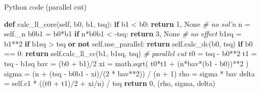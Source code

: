 \documentclass[
  ignorenonframetext,
  aspectratio=169,
  serif,onlymath]{beamer}
\newenvironment{Shaded}{}{}
\newcommand{\CommentTok}[1]{\textcolor[rgb]{0.38,0.63,0.69}{\textit{#1}}}
\newcommand{\ControlFlowTok}[1]{\textcolor[rgb]{0.00,0.44,0.13}{\textbf{#1}}}
\newcommand{\DecValTok}[1]{\textcolor[rgb]{0.25,0.63,0.44}{#1}}
\newcommand{\KeywordTok}[1]{\textcolor[rgb]{0.00,0.44,0.13}{\textbf{#1}}}
\newcommand{\NormalTok}[1]{#1}
\newcommand{\OperatorTok}[1]{\textcolor[rgb]{0.40,0.40,0.40}{#1}}
\newcommand{\VariableTok}[1]{\textcolor[rgb]{0.10,0.09,0.49}{#1}}
\begin{document}
\begin{frame}[fragile]{Python code (parallel cut)}
\protect\hypertarget{python-code-parallel-cut}{}

\scriptsize

\begin{Shaded}
\begin{Highlighting}[]
\KeywordTok{def}\NormalTok{ calc_ll_core(}\VariableTok{self}\NormalTok{, b0, b1, tsq):}
    \ControlFlowTok{if}\NormalTok{ b1 }\OperatorTok{<}\NormalTok{ b0:}
        \ControlFlowTok{return} \DecValTok{1}\NormalTok{, }\VariableTok{None}  \CommentTok{# no sol'n}
\NormalTok{    n }\OperatorTok{=} \VariableTok{self}\NormalTok{._n}
\NormalTok{    b0b1 }\OperatorTok{=}\NormalTok{ b0}\OperatorTok{*}\NormalTok{b1}
    \ControlFlowTok{if}\NormalTok{ n}\OperatorTok{*}\NormalTok{b0b1 }\OperatorTok{<} \OperatorTok{-}\NormalTok{tsq:}
        \ControlFlowTok{return} \DecValTok{3}\NormalTok{, }\VariableTok{None}  \CommentTok{# no effect}
\NormalTok{    b1sq }\OperatorTok{=}\NormalTok{ b1}\OperatorTok{**}\DecValTok{2}
    \ControlFlowTok{if}\NormalTok{ b1sq }\OperatorTok{>}\NormalTok{ tsq }\KeywordTok{or} \KeywordTok{not} \VariableTok{self}\NormalTok{.use_parallel:}
        \ControlFlowTok{return} \VariableTok{self}\NormalTok{.calc_dc(b0, tsq)}
    \ControlFlowTok{if}\NormalTok{ b0 }\OperatorTok{==} \DecValTok{0}\NormalTok{:}
        \ControlFlowTok{return} \VariableTok{self}\NormalTok{.calc_ll_cc(b1, b1sq, tsq)}
    \CommentTok{# parallel cut}
\NormalTok{    t0 }\OperatorTok{=}\NormalTok{ tsq }\OperatorTok{-}\NormalTok{ b0}\OperatorTok{**}\DecValTok{2}
\NormalTok{    t1 }\OperatorTok{=}\NormalTok{ tsq }\OperatorTok{-}\NormalTok{ b1sq}
\NormalTok{    bav }\OperatorTok{=}\NormalTok{ (b0 }\OperatorTok{+}\NormalTok{ b1)}\OperatorTok{/}\DecValTok{2}
\NormalTok{    xi }\OperatorTok{=}\NormalTok{ math.sqrt( t0}\OperatorTok{*}\NormalTok{t1 }\OperatorTok{+}\NormalTok{ (n}\OperatorTok{*}\NormalTok{bav}\OperatorTok{*}\NormalTok{(b1 }\OperatorTok{-}\NormalTok{ b0))}\OperatorTok{**}\DecValTok{2}\NormalTok{ )}
\NormalTok{    sigma }\OperatorTok{=}\NormalTok{ (n }\OperatorTok{+}\NormalTok{ (tsq }\OperatorTok{-}\NormalTok{ b0b1 }\OperatorTok{-}\NormalTok{ xi)}\OperatorTok{/}\NormalTok{(}\DecValTok{2} \OperatorTok{*}\NormalTok{ bav}\OperatorTok{**}\DecValTok{2}\NormalTok{)) }\OperatorTok{/}\NormalTok{ (n }\OperatorTok{+} \DecValTok{1}\NormalTok{)}
\NormalTok{    rho }\OperatorTok{=}\NormalTok{ sigma }\OperatorTok{*}\NormalTok{ bav}
\NormalTok{    delta }\OperatorTok{=} \VariableTok{self}\NormalTok{.c1 }\OperatorTok{*}\NormalTok{ ((t0 }\OperatorTok{+}\NormalTok{ t1)}\OperatorTok{/}\DecValTok{2} \OperatorTok{+}\NormalTok{ xi}\OperatorTok{/}\NormalTok{n) }\OperatorTok{/}\NormalTok{ tsq}
    \ControlFlowTok{return} \DecValTok{0}\NormalTok{, (rho, sigma, delta)}
\end{Highlighting}
\end{Shaded}

\end{frame}
\end{document}
